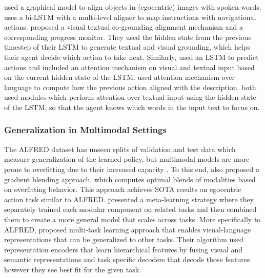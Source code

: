 \documentclass[11pt,a4paper]{article}
\begin{document}
\cite{Chen2004Grounding} used a graphical model to align objects in (egocentric) images with spoken words. \cite{mei2015listen} uses a bi-LSTM with a multi-level aligner to map instructions with navigational actions. \cite{ma2019selfmonitoring} proposed a visual textual co-grounding alignment mechanism and a corresponding progress monitor. They used the hidden state from the previous timestep of their LSTM to generate textual and visual grounding, which helps their agent decide which action to take next. Similarly, \cite{wang2019reinforced} used an LSTM to predict actions and included an attention mechanism on visual and textual input based on the current hidden state of the LSTM. \cite{ke2019tactical} used attention mechanism over language to compute how the previous action aligned with the description. \cite{wang2018look, shridhar2020alfred} both used modules which  perform attention over textual input using the hidden state of the LSTM, so that the agent knows which words in the input text to focus on.

\subsubsection{Generalization in Multimodal Settings}

The ALFRED dataset has unseen splits of validation and test data which measure generalization of the learned policy, but multimodal models are more prone to overfitting due to their increased capacity \cite{wang2020makes}. To this end, \cite{wang2020makes} also proposed a gradient blending approach, which computes optimal blends of modalities based on overfitting behavior. This approach achieves SOTA results on egocentric action task similar to ALFRED. \cite{alet2019modular} presented a meta-learning strategy where they separately trained each modular component on related tasks and then combined them to create a more general model that scales across tasks. More specifically to ALFRED, \cite{nguyen2018multitask} proposed multi-task learning approach that enables visual-language representations that can be generalized to other tasks. Their algorithm used representation encoders that learn hierarchical features by fusing visual and semantic representations and task specific decoders that decode those features however they see best fit for the given task.
\end{document}

